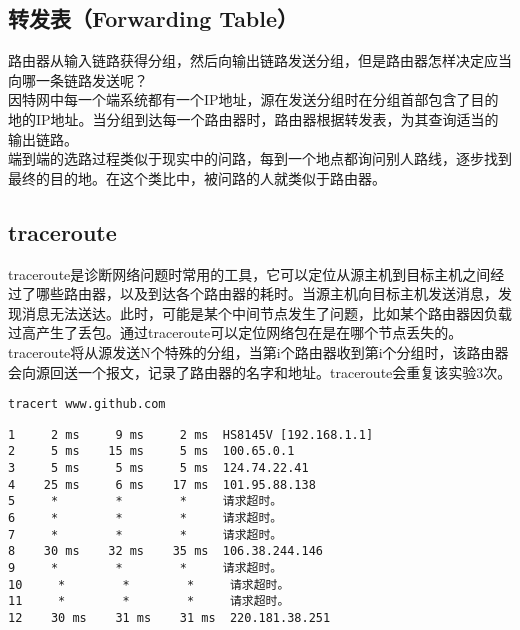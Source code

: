 \vspace{0.5cm}

\subsection{转发表（Forwarding Table）}

路由器从输入链路获得分组，然后向输出链路发送分组，但是路由器怎样决定应当向哪一条链路发送呢？\\

因特网中每一个端系统都有一个IP地址，源在发送分组时在分组首部包含了目的地的IP地址。当分组到达每一个路由器时，路由器根据转发表，为其查询适当的输出链路。\\

端到端的选路过程类似于现实中的问路，每到一个地点都询问别人路线，逐步找到最终的目的地。在这个类比中，被问路的人就类似于路由器。\\

\subsection{traceroute}

traceroute是诊断网络问题时常用的工具，它可以定位从源主机到目标主机之间经过了哪些路由器，以及到达各个路由器的耗时。当源主机向目标主机发送消息，发现消息无法送达。此时，可能是某个中间节点发生了问题，比如某个路由器因负载过高产生了丢包。通过traceroute可以定位网络包在是在哪个节点丢失的。\\

traceroute将从源发送N个特殊的分组，当第i个路由器收到第i个分组时，该路由器会向源回送一个报文，记录了路由器的名字和地址。traceroute会重复该实验3次。\\


\begin{lstlisting}
tracert www.github.com
\end{lstlisting}

\begin{tcolorbox}
    \begin{verbatim}
1     2 ms     9 ms     2 ms  HS8145V [192.168.1.1]
2     5 ms    15 ms     5 ms  100.65.0.1
3     5 ms     5 ms     5 ms  124.74.22.41
4    25 ms     6 ms    17 ms  101.95.88.138
5     *        *        *     请求超时。
6     *        *        *     请求超时。
7     *        *        *     请求超时。
8    30 ms    32 ms    35 ms  106.38.244.146
9     *        *        *     请求超时。
10     *        *        *     请求超时。
11     *        *        *     请求超时。
12    30 ms    31 ms    31 ms  220.181.38.251
	\end{verbatim}
\end{tcolorbox}

